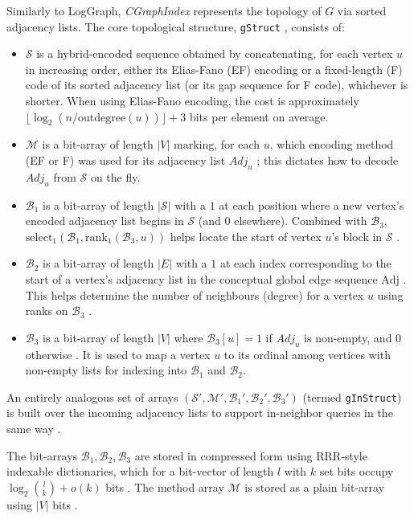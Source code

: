 Similarly to LogGraph, \emph{CGraphIndex} represents the topology of $G$ via sorted adjacency lists. The core topological structure, \texttt{gStruct} , consists of:
\begin{itemize}
    \item $\mathcal{S}$ is a hybrid-encoded sequence obtained by concatenating, for each vertex $u$ in increasing order, either its Elias-Fano (EF) encoding or a fixed-length (F) code of its sorted adjacency list (or its gap sequence for F code), whichever is shorter. When using Elias-Fano encoding, the cost is approximately $\lfloor \log_2 (n / \mathrm{outdegree}(u)) \rfloor + 3$ bits per element on average.

    \item $\mathcal{M}$ is a bit-array of length $|V|$ marking, for each $u$, which encoding method (EF or F) was used for its adjacency list $Adj_u$ ; this dictates how to decode $Adj_u$ from $\mathcal{S}$ on the fly.

    \item $\mathcal{B}_1$ is a bit-array of length $|\mathcal{S}|$ with a $1$ at each position where a new vertex's encoded adjacency list begins in $\mathcal{S}$ (and $0$ elsewhere). Combined with $\mathcal{B}_3$, $\mathrm{select}_1(\mathcal{B}_1, \mathrm{rank}_1(\mathcal{B}_3, u))$ helps locate the start of vertex $u$'s block in $\mathcal{S}$ .

    \item $\mathcal{B}_2$ is a bit-array of length $|E|$ with a $1$ at each index corresponding to the start of a vertex's adjacency list in the conceptual global edge sequence $\mathrm{Adj}$ . This helps determine the number of neighbours (degree) for a vertex $u$ using ranks on $\mathcal{B}_3$ .

    \item $\mathcal{B}_3$ is a bit-array of length $|V|$ where $\mathcal{B}_3[u]=1$ if $Adj_u$ is non-empty, and $0$ otherwise . It is used to map a vertex $u$ to its ordinal among vertices with non-empty lists for indexing into $\mathcal{B}_1$ and $\mathcal{B}_2$.
\end{itemize}

An entirely analogous set of arrays $(\mathcal{S}', \mathcal{M}', \mathcal{B}_1', \mathcal{B}_2', \mathcal{B}_3')$ (termed \texttt{gInStruct}) is built over the incoming adjacency lists to support in-neighbor queries in the same way .

The bit-arrays $\mathcal{B}_1, \mathcal{B}_2, \mathcal{B}_3$ are stored in compressed form using RRR‑style \cite{RRRbitvector} indexable dictionaries, which for a bit-vector of length $l$ with $k$ set bits occupy $\log_2 \binom{l}{k} + o(k)$ bits . The method array $\mathcal{M}$ is stored as a plain bit-array using $|V|$ bits .

